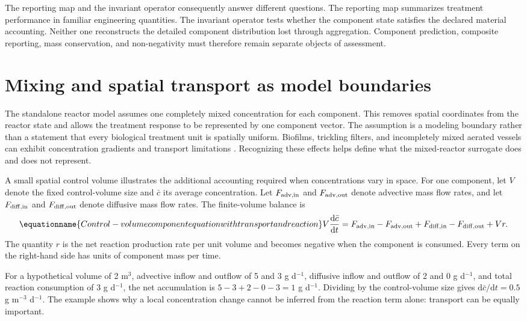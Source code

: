 The reporting map and the invariant operator consequently answer different questions. The reporting map summarizes treatment performance in familiar engineering quantities. The invariant operator tests whether the component state satisfies the declared material accounting. Neither one reconstructs the detailed component distribution lost through aggregation. Component prediction, composite reporting, mass conservation, and non-negativity must therefore remain separate objects of assessment.

\section{Mixing and spatial transport as model boundaries}

The standalone reactor model assumes one completely mixed concentration for each component. This removes spatial coordinates from the reactor state and allows the treatment response to be represented by one component vector. The assumption is a modeling boundary rather than a statement that every biological treatment unit is spatially uniform. Biofilms, trickling filters, and incompletely mixed aerated vessels can exhibit concentration gradients and transport limitations \citep{Wik2003,Zhang1994,SadinoRiquelme2023}. Recognizing these effects helps define what the mixed-reactor surrogate does and does not represent.

A small spatial control volume illustrates the additional accounting required when concentrations vary in space. For one component, let $V$ denote the fixed control-volume size and $\bar c$ its average concentration. Let
$F_{\rm adv,in}$ and $F_{\rm adv,out}$ denote advective mass flow rates, and let
$F_{\rm diff,in}$ and $F_{\rm diff,out}$ denote diffusive mass flow rates. The finite-volume balance is
\begin{equation}
\equationname{Control-volume component equation with transport and reaction}
V\frac{\mathrm d\bar c}{\mathrm dt}
=F_{\rm adv,in}-F_{\rm adv,out}
+F_{\rm diff,in}-F_{\rm diff,out}+Vr.
\label{eq:teaching_spatial_control_volume}
\end{equation}
The quantity $r$ is the net reaction production rate per unit volume and becomes negative when the component is consumed. Every term on the right-hand side has units of component mass per time.

For a hypothetical volume of 2 m$^3$, advective inflow and outflow of 5 and 3 g d$^{-1}$, diffusive inflow and outflow of 2 and 0 g d$^{-1}$, and total reaction consumption of 3 g d$^{-1}$, the net accumulation is
$5-3+2-0-3=1$ g d$^{-1}$. Dividing by the control-volume size gives
$\mathrm d\bar c/\mathrm dt=0.5$ g m$^{-3}$ d$^{-1}$. The example shows why a local concentration change cannot be inferred from the reaction term alone: transport can be equally important.

